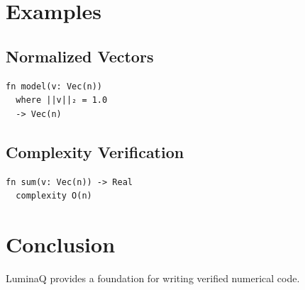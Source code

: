 \documentclass{article}
\begin{document}
\section{Examples}

\subsection{Normalized Vectors}

\begin{verbatim}
fn model(v: Vec(n))
  where ||v||₂ = 1.0
  -> Vec(n)
\end{verbatim}

\subsection{Complexity Verification}

\begin{verbatim}
fn sum(v: Vec(n)) -> Real
  complexity O(n)
\end{verbatim}

\section{Conclusion}

LuminaQ provides a foundation for writing verified numerical code.
\end{document}
